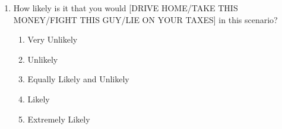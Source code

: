 \documentclass{article} %
\begin{document}
\begin{enumerate}[A]
{\begin{enumerate}
\begin{enumerate}[0]
\item No fun or kick at all  
\item 
\item 
\item
\item 
\item
\item 
\item
\item 
\item A great deal of fun or kick
\end{enumerate}
\item How likely is it that you would [DRIVE HOME/TAKE THIS MONEY/FIGHT THIS GUY/LIE ON YOUR TAXES] in this scenario? 
\begin{enumerate}
\item Very Unlikely
\item Unlikely
\item Equally Likely and Unlikely
\item Likely
\item Extremely Likely
\end{enumerate}
\end{enumerate}


}
\end{enumerate}
\end{document}
